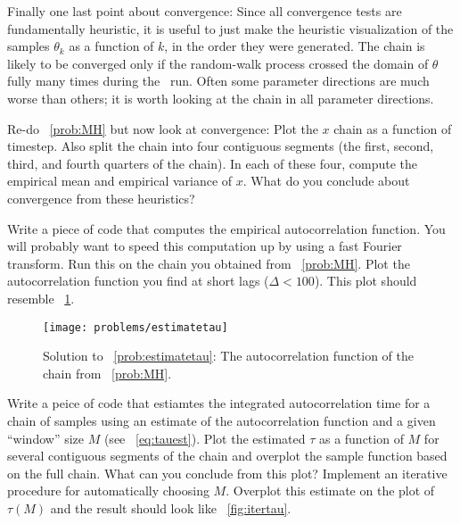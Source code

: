\documentclass[modern]{aastex61}
\newcommand{\MCMC}{\acronym{MCMC}}
\newcommand{\pars}{\theta}
\begin{document}
Finally one last point about convergence:
Since all convergence tests are fundamentally heuristic, it is useful
to just make the heuristic visualization of the samples $\pars_k$ as a
function of $k$, in the order they were generated.
The chain is likely to be converged only if the random-walk process
crossed the domain of $\pars$ fully many times during the \MCMC\ run.
Often some parameter directions are much worse than others; it is
worth looking at the chain in all parameter directions.

\begin{problem}\label{prob:convergence}
Re-do \problemname~\ref{prob:MH} but now look at convergence:
Plot the $x$ chain as a function of timestep.  Also split the chain
into four contiguous segments (the first, second, third, and fourth
quarters of the chain).  In each of these four, compute the empirical
mean and empirical variance of $x$.  What do you conclude about
convergence from these heuristics?
\end{problem}

\begin{problem}\label{prob:estimatetau}
Write a piece of code that computes the empirical autocorrelation
function.
You will probably want to speed this computation up by using a fast Fourier
transform.
Run this on the chain you obtained from \problemname~\ref{prob:MH}.
Plot the autocorrelation function you find at short lags ($\Delta < 100$).
This plot should resemble \figurename~\ref{fig:estimatetau}.
\end{problem}

\begin{figure}[!htbp]
\begin{center}
\texttt{[image: problems/estimatetau]}
\end{center}
\caption{Solution to \problemname~\ref{prob:estimatetau}:
The autocorrelation function of the chain from \problemname~\ref{prob:MH}.}
\label{fig:estimatetau}
\end{figure}

\begin{problem}\label{prob:itertau}
Write a peice of code that estiamtes the integrated autocorrelation time for a
chain of samples using an estimate of the autocorrelation function and a given
``window'' size $M$ (see \equationname~\ref{eq:tauest}).
Plot the estimated $\tau$ as a function of $M$ for several contiguous segments
of the chain and overplot the sample function based on the full chain.
What can you conclude from this plot?
Implement an iterative procedure for automatically choosing $M$.
Overplot this estimate on the plot of $\tau(M)$ and the result should look
like \figurename~\ref{fig:itertau}.
\end{problem}
\end{document}
